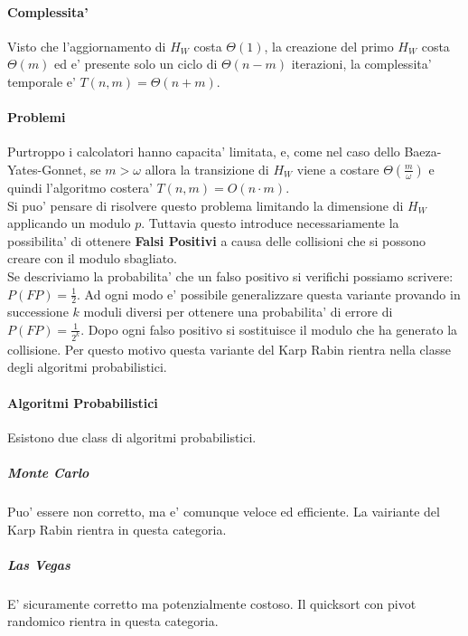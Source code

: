 \pagebreak

\paragraph{Complessita'}

Visto che l'aggiornamento di $H_{W}$ costa $\Theta(1)$, la creazione del primo $H_{W}$ costa $\Theta(m)$ ed e' presente solo un ciclo di $\Theta(n - m)$ iterazioni, la complessita' temporale e' $T(n,m) = \Theta(n + m)$. \\

\paragraph{Problemi}

Purtroppo i calcolatori hanno capacita' limitata, e, come nel caso dello Baeza-Yates-Gonnet, se $m > \omega$ allora la transizione di $H_{W}$ viene a costare $\Theta(\frac m \omega)$ e quindi l'algoritmo costera' $T(n,m) = O(n \cdot m)$. \\

Si puo' pensare di risolvere questo problema limitando la dimensione di $H_{W}$ applicando un modulo $p$. Tuttavia questo introduce necessariamente la possibilita' di ottenere \textbf{Falsi Positivi} a causa delle collisioni che si possono creare con il modulo sbagliato. \\

Se descriviamo la probabilita' che un falso positivo si verifichi possiamo scrivere: $P(FP) = \frac 1 2$. Ad ogni modo e' possibile generalizzare questa variante provando in successione $k$ moduli diversi per ottenere una probabilita' di errore di $P(FP) = \frac 1 {2 ^ k}$. Dopo ogni falso positivo si sostituisce il modulo che ha generato la collisione.
Per questo motivo questa variante del Karp Rabin rientra nella classe degli algoritmi probabilistici.

\paragraph{Algoritmi Probabilistici}

Esistono due class di algoritmi probabilistici.

\subparagraph{Monte Carlo}
Puo' essere non corretto, ma e' comunque veloce ed efficiente.
La vairiante del Karp Rabin rientra in questa categoria.

\subparagraph{Las Vegas}
E' sicuramente corretto ma potenzialmente costoso.
Il quicksort con pivot randomico rientra in questa categoria.
